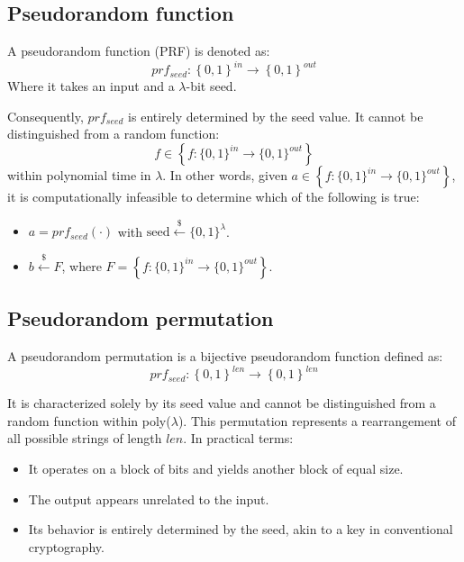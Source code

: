 \subsection{Pseudorandom function}
\begin{definition}
    A pseudorandom function (PRF) is denoted as: 
    \[prf_{seed}:\left\{ 0,1 \right\}^{in} \rightarrow \left\{ 0,1 \right\}^{out}\]
    Where it takes an input and a $\lambda$-bit seed.
\end{definition}
Consequently, $prf_{seed}$ is entirely determined by the seed value.
It cannot be distinguished from a random function: 
\[ f \in \left\{ f:\{ 0,1 \}^{in} \rightarrow \{ 0,1 \}^{out}\right\}\]
within polynomial time in $\lambda$.
In other words, given $a \in \left\{ f:\{ 0,1 \}^{in} \rightarrow \{ 0,1 \}^{out}\right\}$, it is computationally infeasible to determine which of the following is true:
\begin{itemize}
    \item $a=prf_{seed}(\cdot)$ with $\text{seed}\overset{\$}{\leftarrow}\{0,1\}^\lambda$. 
    \item $b\overset{\$}{\leftarrow}F$, where $F=\left\{ f:\{ 0,1 \}^{in} \rightarrow \{ 0,1 \}^{out}\right\}$.
\end{itemize}

\subsection{Pseudorandom permutation}
\begin{definition}
    A pseudorandom permutation is a bijective pseudorandom function defined as:
    \[prf_{seed}:\left\{ 0,1 \right\}^{len}\rightarrow\left\{ 0,1 \right\}^{len}\]
\end{definition}
It is characterized solely by its seed value and cannot be distinguished from a random function within poly($\lambda$).
This permutation represents a rearrangement of all possible strings of length $len$.
In practical terms:
\begin{itemize}
    \item It operates on a block of bits and yields another block of equal size.
    \item The output appears unrelated to the input.
    \item Its behavior is entirely determined by the seed, akin to a key in conventional cryptography.
\end{itemize}

